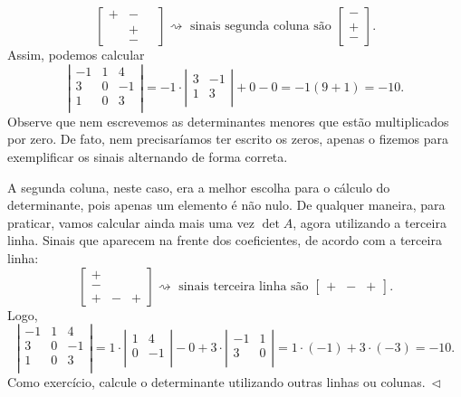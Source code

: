 \documentclass[../livro.tex]{subfiles}  %
\begin{document}
\begin{example}
\[\begin{bmatrix}
+ & - &  \,\, \\
\,\,& + &  \,\, \\
\,\,& - &  \,\, 
\end{bmatrix}\rightsquigarrow \text{ sinais segunda coluna são }
\begin{bmatrix}
- \\ + \\ -
\end{bmatrix}.
\] Assim, podemos calcular
\[
\left| 
\begin{matrix}
-1 & 1 & 4 \\
3 & 0 & -1 \\
1 & 0 & 3 \\
\end{matrix}
\right| = -1 \cdot 
\left| 
\begin{matrix}
3  & -1 \\
1  & 3 \\
\end{matrix}
\right| + 0 - 0 = -1 (9 + 1) = -10.
\] Observe que nem escrevemos as determinantes menores que estão multiplicados por zero. De fato, nem precisaríamos ter escrito os zeros, apenas o fizemos para exemplificar os sinais alternando de forma correta.

A segunda coluna, neste caso, era a melhor escolha para o cálculo do determinante, pois apenas um elemento é não nulo. De qualquer maneira, para praticar, vamos calcular ainda mais uma vez $\det A$, agora utilizando a terceira linha. Sinais que aparecem na frente dos coeficientes, de acordo com a terceira linha:
\[
\begin{bmatrix}
+ & \,\, & \,\, \\
- & \,\, & \,\, \\
+ &  -   &   +
\end{bmatrix}\rightsquigarrow \text{ sinais terceira linha são }
\begin{bmatrix}
+ & - & + 
\end{bmatrix}.
\] Logo,
\[
\left| 
\begin{matrix}
-1 & 1 & 4 \\
3 & 0 & -1 \\
1 & 0 & 3 \\
\end{matrix}
\right| = 1 \cdot 
\left| 
\begin{matrix}
 1 & 4 \\
 0 & -1 \\
\end{matrix}
\right| - 0 + 3 \cdot
\left| 
\begin{matrix}
-1 & 1 \\
3 & 0  \\
\end{matrix}
\right| = 1 \cdot (-1) + 3 \cdot (-3) = -10.
\] Como exercício, calcule o determinante utilizando outras linhas ou colunas$. \ \lhd$
\end{example}
\end{document}
